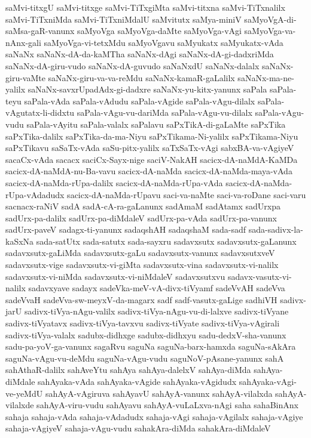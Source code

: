 {saMvi-titxgU
saMvi-titxge
saMvi-TiTxgiMta
saMvi-titxna
saMvi-TiTxnalilx
saMvi-TiTxniMda
saMvi-TiTxniMdalU
saMvitutx
saMya-miniV
saMyoVgA-di-saMsa-gaR-vanunx
saMyoVga
saMyoVga-daMte
saMyoVga-vAgi
saMyoVga-va-nAnx-gali
saMyoVga-vi-tetxMdu
saMyoVgavu
saMyukatx
saMyukatx-vAda
saNaNx
saNaNx-dA-da-kaMTha
saNaNx-dAgi
saNaNx-dA-gi-dadxriMda
saNaNx-dA-giru-vudo
saNaNx-dA-guvudo
saNaNxdU
saNaNx-dalalx
saNaNx-giru-vaMte
saNaNx-giru-va-va-reMdu
saNaNx-kamaR-gaLalilx
saNaNx-ma-ne-yalilx
saNaNx-savxrUpadAdx-gi-dadxre
saNaNx-yu-kitx-yanunx
saPala
saPala-teyu
saPala-vAda
saPala-vAdudu
saPala-vAgide
saPala-vAgu-dilalx
saPala-vAgutatx-li-didxtu
saPala-vAgu-vu-dariMda
saPala-vAgu-vu-dilalx
saPala-vAgu-vudu
saPala-vAyitu
saPala-valalx
saPalavu
saPxTikA-di-gaLaMte
saPxTika
saPxTika-dalilx
saPxTika-da-ma-Niyu
saPxTikama-Ni-yalilx
saPxTikama-Niyu
saPxTikavu
saSaTx-vAda
saSu-pitx-yalilx
saTxSaTx-vAgi
sabxBA-va-vAgiyeV
sacaCx-vAda
sacacx
saciCx-Sayx-nige
saciV-NakAH
sacicx-dA-naMdA-KaMDa
sacicx-dA-naMdA-nu-Ba-vavu
sacicx-dA-naMda
sacicx-dA-naMda-maya-vAda
sacicx-dA-naMda-rUpa-dalilx
sacicx-dA-naMda-rUpa-vAda
sacicx-dA-naMda-rUpa-vAdadudx
sacicx-dA-naMda-rUpavu
saci-va-naMte
saci-va-roDane
saci-varu
sacnacx-raNiV
sadA
sadA-cA-ra-gaLanunx
sadAmaM
sadAtamx
sadUrxpa
sadUrx-pa-dalilx
sadUrx-pa-diMdaleV
sadUrx-pa-vAda
sadUrx-pa-vanunx
sadUrx-paveV
sadagx-ti-yanunx
sadaqshAH
sadaqshaM
sada-sadf
sada-sadivx-la-kaSxNa
sada-satUtx
sada-satutx
sada-sayxru
sadavxsutx
sadavxsutx-gaLanunx
sadavxsutx-gaLiMda
sadavxsutx-gaLu
sadavxsutx-vanunx
sadavxsutxveV
sadavxsutx-vige
sadavxsutx-vi-giMta
sadavxsutx-vina
sadavxsutx-vi-nalilx
sadavxsutx-vi-niMda
sadavxsutx-vi-niMdaleV
sadavxsutxvu
sadavx-vasutx-vi-nalilx
sadavxyave
sadayx
sadeVka-meV-vA-divx-tiVyamf
sadeVvAH
sadeVva
sadeVvaH
sadeVva-sw-meyxV-da-magarx
sadf
sadf-vasutx-gaLige
sadhiVH
sadivx-jarU
sadivx-tiVya-nAgu-valilx
sadivx-tiVya-nAgu-vu-di-lalxve
sadivx-tiVyane
sadivx-tiVyatavx
sadivx-tiVya-tavxvu
sadivx-tiVyate
sadivx-tiVya-vAgirali
sadivx-tiVya-valalx
sadubx-didhxge
sadubx-didhxyu
sadu-dedxV-sha-vanunx
sadu-pa-yoV-ga-vanunx
sagaRvu
saguNa
saguNa-barx-hamxda
saguNa-sAkAra
saguNa-vAgu-vu-deMdu
saguNa-vAgu-vudu
saguNoV-pAsane-yanunx
sahA
sahAthaR-dalilx
sahAveYtu
sahAya
sahAya-dalelxV
sahAya-diMda
sahAya-diMdale
sahAyaka-vAda
sahAyaka-vAgide
sahAyaka-vAgidudx
sahAyaka-vAgi-ve-yeMdU
sahAyA-vAgiruva
sahAyavU
sahAyA-vanunx
sahAyA-vilalxda
sahAyA-vilalxde
sahAyA-viru-vudu
sahAyavu
sahAyA-vuLaLxva-nAgi
saha
sahaBinAnx
sahaja
sahaja-vAda
sahaja-vAdadudx
sahaja-vAgi
sahaja-vAgilalx
sahaja-vAgiye
sahaja-vAgiyeV
sahaja-vAgu-vudu
sahakAra-diMda
sahakAra-diMdaleV
}
